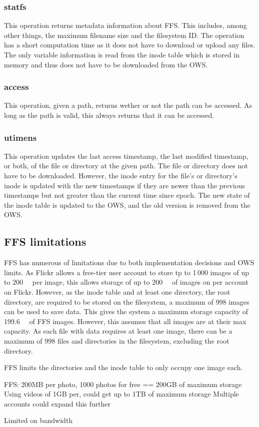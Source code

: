 \subsubsection{statfs}
This operation returns metadata information about FFS. This includes, among other things, the maximum filename size and the filesystem ID. The operation has a short computation time as it does not have to download or upload any files. The only variable information is read from the inode table which is stored in memory and thus does not have to be downloaded from the OWS.

\subsubsection{access}
This operation, given a path, returns wether or not the path can be accessed. As long as the path is valid, this always returns that it can be accessed.

\subsubsection{utimens}
This operation updates the last access timestamp, the last modified timestamp, or both, of the file or directory at the given path. The file or directory does not have to be downloaded. However, the inode entry for the file's or directory's inode is updated with the new timestamps if they are newer than the previous timestamps but not greater than the current time since epoch. The new state of the inode table is updated to the OWS, and the old version is removed from the OWS.


\subsection{FFS limitations}
FFS has numerous of limitations due to both implementation decisions and OWS limits. As Flickr allows a free-tier user account to store tp to 1\,000 images of up to \SI{200}{\mega\byte} per image, this allows storage of up to \SI{200}{\giga\byte} of images on per account on Flickr. However, as the inode table and at least one directory, the root directory, are required to be stored on the filesystem, a maximum of 998 images can be used to save data. This gives the system a maximum storage capacity of \SI{199.6}{\gia\byte} of FFS images. However, this assumes that all images are at their max capacity. As each file with data requires at least one image, there can be a maximum of 998 files and directories in the filesystem, excluding the root directory. 

FFS limits the directories and the inode table to only occupy one image each. 

FFS:
200MB per photo, 1000 photos for free == 200GB of maximum storage
Using videos of 1GB per, could get up to 1TB of maximum storage
Multiple accounts could expand this further

Limited on bandwidth